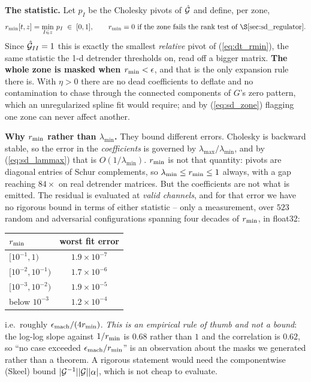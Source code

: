 \documentclass{article}
\numberwithin{equation}{section}   %
\begin{document}
{\bf The statistic.}  Let $p_I$ be the Cholesky pivots of $\hat{\cal G}$ and define, per zone,
\begin{equation}
r_{\rm min}[t,z] = \min_{I \in z}\, p_I \;\in\; [0,1],
\qquad r_{\rm min} \equiv 0 \mbox{ if the zone fails the rank test of \S\ref{sec:sd_regulator}} .
\label{eq:sd_rmin}
\end{equation}
Since $\hat{\cal G}_{II} = 1$ this is exactly the smallest {\em relative} pivot of (\ref{eq:dt_rmin}), the same
statistic the 1-d detrender thresholds on, read off a bigger matrix.
{\bf The whole zone is masked when $r_{\rm min} < \epsilon$}, and that is the only expansion rule there is.
With $\eta > 0$ there are no dead coefficients to deflate and no contamination to chase through the connected
components of $G$'s zero pattern, which an unregularized spline fit would require; and by (\ref{eq:sd_zone})
flagging one zone can never affect another.

{\bf Why $r_{\rm min}$ rather than $\lambda_{\min}$.}  They bound different errors.  Cholesky is backward
stable, so the error in the {\em coefficients} is governed by $\lambda_{\max}/\lambda_{\min}$, and by
(\ref{eq:sd_lammax}) that is $O(1/\lambda_{\min})$.  $r_{\rm min}$ is not that quantity: pivots are diagonal
entries of Schur complements, so $\lambda_{\min} \le r_{\rm min} \le 1$ always, with a gap reaching $84\times$
on real detrender matrices.  But the coefficients are not what is emitted.  The residual is evaluated at
{\em valid channels}, and for that error we have no rigorous bound in terms of either statistic -- only a
measurement, over $523$ random and adversarial configurations spanning four decades of $r_{\rm min}$, in
float32:
\begin{center}
\small
\begin{tabular}{lc}
\toprule
$r_{\rm min}$ & worst fit error \\
\midrule
$[10^{-1}, 1)$      & $1.9\times10^{-7}$ \\
$[10^{-2}, 10^{-1})$ & $1.7\times10^{-6}$ \\
$[10^{-3}, 10^{-2})$ & $1.9\times10^{-5}$ \\
below $10^{-3}$      & $1.2\times10^{-4}$ \\
\bottomrule
\end{tabular}
\end{center}
i.e.~roughly $\epsilon_{\rm mach}/(4 r_{\rm min})$.  {\em This is an empirical rule of thumb and not a bound}:
the log-log slope against $1/r_{\rm min}$ is $0.68$ rather than $1$ and the correlation is $0.62$, so ``no case
exceeded $\epsilon_{\rm mach}/r_{\rm min}$'' is an observation about the masks we generated rather than a
theorem.  A rigorous statement would need the componentwise (Skeel) bound $|{\cal G}^{-1}||{\cal G}||\alpha|$,
which is not cheap to evaluate.
\end{document}
